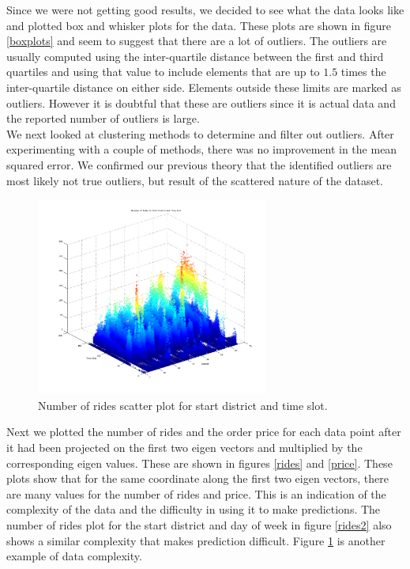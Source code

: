 \documentclass[paper=a4, fontsize=11pt]{scrartcl} %
\numberwithin{equation}{section} %
\numberwithin{table}{section} %
\begin{document}
Since we were not getting good results, we decided to see what the data looks like and plotted box and whisker plots for the data. These plots are shown in figure \ref{boxplots} and seem to suggest that there are a lot of outliers. The outliers are usually computed using the inter-quartile distance between the first and third quartiles and using that value to include elements that are up to $1.5$ times the inter-quartile distance on either side. Elements outside these limits are marked as outliers. However it is doubtful that these are outliers since it is actual data and the reported number of outliers is large.  \\

We next looked at clustering methods to determine and filter out outliers. After experimenting with a couple of methods, there was no improvement in the mean squared error. We confirmed our previous theory that the identified outliers are most likely not true outliers, but result of the scattered nature of the dataset. \\

\begin{figure}[!htb]
\centering
\includegraphics[width=3in]{figures/NumberofRidesforDistrictandTimeSlot.png}
\caption{Number of rides scatter plot for start district and time slot.}
\label{rides3}
\end{figure}

Next we plotted the number of rides and the order price for each data point after it had been projected on the first two eigen vectors and multiplied by the corresponding eigen values. These are shown in figures \ref{rides} and \ref{price}. These plots show that for the same coordinate along the first two eigen vectors, there are many values for the number of rides and price. This is an indication of the complexity of the data and the difficulty in using it to make predictions. The number of rides plot for the start district and day of week in figure \ref{rides2} also shows a similar complexity that makes prediction difficult. Figure \ref{rides3} is another example of data complexity. \\
\end{document}

